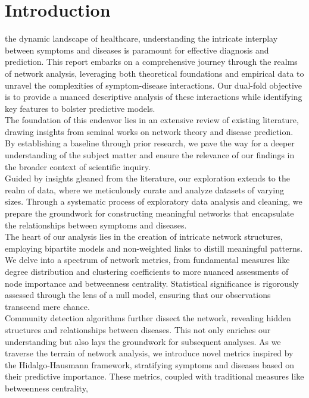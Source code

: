 
\section{Introduction}

 the dynamic landscape of healthcare, understanding the intricate interplay between symptoms and diseases is paramount for effective diagnosis and prediction.
This report embarks on a comprehensive journey through the realms of network analysis,
leveraging both theoretical foundations and empirical data to unravel the complexities of symptom-disease interactions.
Our dual-fold objective is to provide a nuanced descriptive analysis of these interactions while identifying key features to bolster predictive models.\\
The foundation of this endeavor lies in an extensive review of existing literature,
drawing insights from seminal works on network theory and disease prediction.
By establishing a baseline through prior research, we pave the way for a deeper understanding
of the subject matter and ensure the relevance of our findings in the broader context of scientific inquiry.\\
Guided by insights gleaned from the literature, our exploration extends to the realm of data,
where we meticulously curate and analyze datasets of varying sizes.
Through a systematic process of exploratory data analysis and cleaning,
we prepare the groundwork for constructing meaningful networks that encapsulate the relationships between symptoms and diseases.\\
The heart of our analysis lies in the creation of intricate network structures,
employing bipartite models and non-weighted links to distill meaningful patterns.
We delve into a spectrum of network metrics, from fundamental measures like degree distribution and
clustering coefficients to more nuanced assessments of node importance and betweenness centrality.
Statistical significance is rigorously assessed through the lens of a null model, ensuring that our observations transcend mere chance.\\
Community detection algorithms further dissect the network, revealing hidden structures and relationships between diseases.
This not only enriches our understanding but also lays the groundwork for subsequent analyses.
As we traverse the terrain of network analysis, we introduce novel metrics inspired by the Hidalgo-Hausmann framework,
stratifying symptoms and diseases based on their predictive importance. These metrics, coupled with traditional measures like betweenness centrality,
